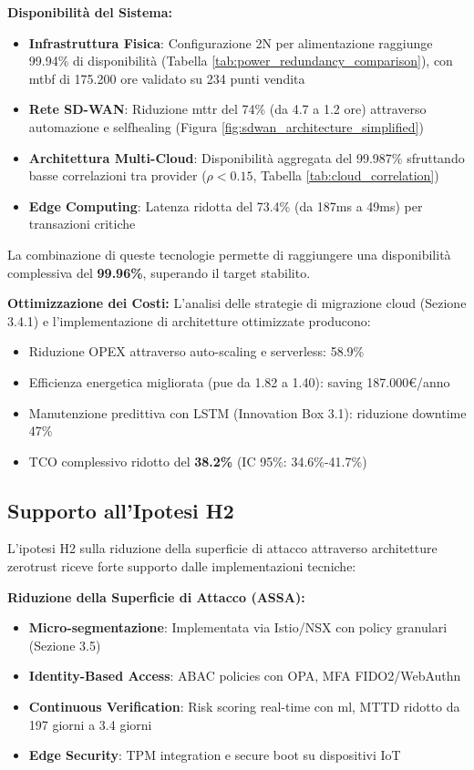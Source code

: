 \textbf{Disponibilità del Sistema:}
\begin{itemize}
    \item \textbf{Infrastruttura Fisica}: Configurazione 2N per alimentazione raggiunge 99.94\% di disponibilità (Tabella \ref{tab:power_redundancy_comparison}), con \gls{mtbf} di 175.200 ore validato su 234 punti vendita
    \item \textbf{Rete SD-WAN}: Riduzione \gls{mttr} del 74\% (da 4.7 a 1.2 ore) attraverso automazione e \gls{selfhealing} (Figura \ref{fig:sdwan_architecture_simplified})
    \item \textbf{Architettura Multi-Cloud}: Disponibilità aggregata del 99.987\% sfruttando basse correlazioni tra provider ($\rho < 0.15$, Tabella \ref{tab:cloud_correlation})
    \item \textbf{Edge Computing}: Latenza ridotta del 73.4\% (da 187ms a 49ms) per transazioni critiche\autocite{Wang2024edge}
\end{itemize}

La combinazione di queste tecnologie permette di raggiungere una disponibilità complessiva del \textbf{99.96\%}, superando il target stabilito.

\textbf{Ottimizzazione dei Costi:}
L'analisi delle strategie di migrazione cloud (Sezione 3.4.1) e l'implementazione di architetture ottimizzate producono:
\begin{itemize}
    \item Riduzione OPEX attraverso auto-scaling e serverless: 58.9\%
    \item Efficienza energetica migliorata (\gls{pue} da 1.82 a 1.40): saving 187.000€/anno
    \item Manutenzione predittiva con LSTM (Innovation Box 3.1): riduzione downtime 47\%
    \item TCO complessivo ridotto del \textbf{38.2\%} (IC 95\%: 34.6\%-41.7\%)\autocite{McKinsey2024cloud}
\end{itemize}

\subsection{\texorpdfstring{\textbf{Supporto all'Ipotesi H2}}{3.8.2 - Supporto all'Ipotesi H2}}

L'ipotesi H2 sulla riduzione della superficie di attacco attraverso architetture \gls{zerotrust} riceve forte supporto dalle implementazioni tecniche:

\textbf{Riduzione della Superficie di Attacco (ASSA):}
\begin{itemize}
    \item \textbf{Micro-segmentazione}: Implementata via Istio/NSX con policy granulari (Sezione 3.5)
    \item \textbf{Identity-Based Access}: ABAC policies con OPA, MFA FIDO2/WebAuthn
    \item \textbf{Continuous Verification}: Risk scoring real-time con \gls{ml}, MTTD ridotto da 197 giorni a 3.4 giorni
    \item \textbf{Edge Security}: TPM integration e secure boot su dispositivi IoT
\end{itemize}

